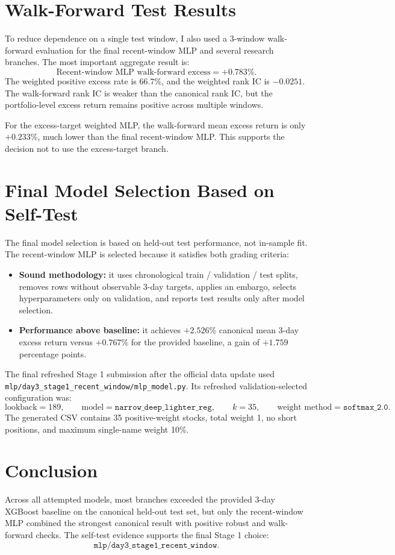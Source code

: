 \documentclass[11pt]{article}
\begin{document}
\section{Walk-Forward Test Results}

To reduce dependence on a single test window, I also used a 3-window
walk-forward evaluation for the final recent-window MLP and several research
branches. The most important aggregate result is:
\[
    \text{Recent-window MLP walk-forward excess}
    =
    +0.783\%.
\]
The weighted positive excess rate is \(66.7\%\), and the weighted rank IC is
\(-0.0251\). The walk-forward rank IC is weaker than the canonical rank IC, but
the portfolio-level excess return remains positive across multiple windows.

For the excess-target weighted MLP, the walk-forward mean excess return is only
\(+0.233\%\), much lower than the final recent-window MLP. This supports the
decision not to use the excess-target branch.

\section{Final Model Selection Based on Self-Test}

The final model selection is based on held-out test performance, not in-sample
fit. The recent-window MLP is selected because it satisfies both grading
criteria:
\begin{itemize}
    \item \textbf{Sound methodology:} it uses chronological train /
    validation / test splits, removes rows without observable 3-day targets,
    applies an embargo, selects hyperparameters only on validation, and reports
    test results only after model selection.
    \item \textbf{Performance above baseline:} it achieves \(+2.526\%\)
    canonical mean 3-day excess return versus \(+0.767\%\) for the provided
    baseline, a gain of \(+1.759\) percentage points.
\end{itemize}

The final refreshed Stage 1 submission after the official data update used
\texttt{mlp/day3\_stage1\_recent\_window/mlp\_model.py}. Its refreshed
validation-selected configuration was:
\[
    \text{lookback}=189,\qquad
    \text{model}=\texttt{narrow\_deep\_lighter\_reg},\qquad
    k=35,\qquad
    \text{weight method}=\texttt{softmax\_2.0}.
\]
The generated CSV contains 35 positive-weight stocks, total weight 1, no short
positions, and maximum single-name weight 10\%.

\section{Conclusion}

Across all attempted models, most branches exceeded the provided 3-day XGBoost
baseline on the canonical held-out test set, but only the recent-window MLP
combined the strongest canonical result with positive robust and walk-forward
checks. The self-test evidence supports the final Stage 1 choice:
\[
    \texttt{mlp/day3\_stage1\_recent\_window}.
\]
\end{document}
